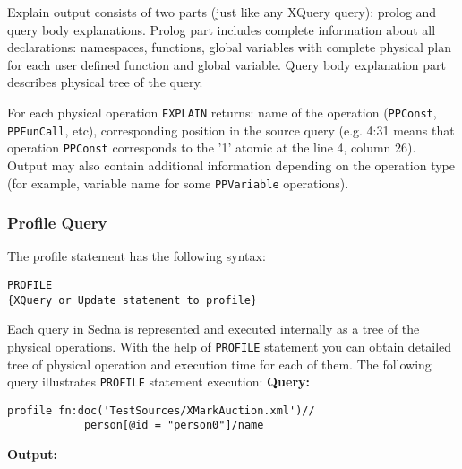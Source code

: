 \documentclass[a4paper,12pt]{article}
\begin{document}
Explain output consists of two parts (just like any XQuery query): prolog and query body explanations. Prolog part includes complete 
information about all declarations: namespaces, functions, global variables with complete physical plan for each user defined function and global variable. 
Query body explanation part describes physical tree of the query.

For each physical operation \verb!EXPLAIN! returns: name of the operation (\verb!PPConst!, \verb!PPFunCall!, etc), corresponding position in the source query
(e.g. 4:31 means that operation \verb!PPConst! corresponds to the '1' atomic at the line 4, column 26). Output may also contain additional information 
depending on the operation type (for example, variable name for some \verb!PPVariable! operations).

\subsubsection{Profile Query}
The profile statement has the following syntax:
\begin{verbatim}
PROFILE
{XQuery or Update statement to profile}
\end{verbatim}
Each query in Sedna is represented and executed internally as a tree of the physical operations. With the help of \verb!PROFILE! statement you
can obtain detailed tree of physical operation and execution time for each of them.
\newline
\newline
The following query illustrates \verb!PROFILE! statement execution:
\newline
\newline
\textbf{Query:}
\begin{verbatim}
profile fn:doc('TestSources/XMarkAuction.xml')//
            person[@id = "person0"]/name
\end{verbatim}
\textbf{Output:}
\end{document}
